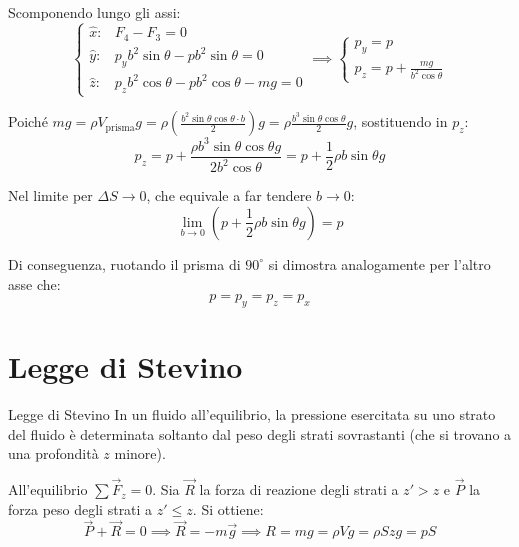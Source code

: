 Scomponendo lungo gli assi:
\begin{equation*}
\begin{cases}
    \hat{x}: & F_4 - F_3 = 0 \\
    \hat{y}: & p_y b^2 \sin\theta - p b^2 \sin\theta = 0 \\
    \hat{z}: & p_z b^2 \cos\theta - p b^2 \cos\theta - mg = 0
\end{cases}
\implies
\begin{cases}
    p_y = p \\
    p_z = p + \frac{mg}{b^2 \cos\theta}
\end{cases}
\end{equation*}

Poiché $mg = \rho V_{\text{prisma}} g = \rho \left( \frac{b^2 \sin\theta \cos\theta \cdot b}{2} \right) g = \rho \frac{b^3 \sin\theta \cos\theta}{2} g$, sostituendo in $p_z$:
\begin{equation}
p_z = p + \frac{\rho b^3 \sin\theta \cos\theta g}{2 b^2 \cos\theta} = p + \frac{1}{2} \rho b \sin\theta g
\end{equation}

Nel limite per $\Delta S \to 0$, che equivale a far tendere $b \to 0$:
\begin{equation}
\lim_{b \to 0} \left( p + \frac{1}{2} \rho b \sin\theta g \right) = p
\end{equation}

Di conseguenza, ruotando il prisma di $90^\circ$ si dimostra analogamente per l'altro asse che:
\begin{equation}
\boxed{p = p_y = p_z = p_x}
\end{equation}

\section{Legge di Stevino}
\begin{teorema}{Legge di Stevino}
In un fluido all'equilibrio, la pressione esercitata su uno strato del fluido è determinata soltanto dal peso degli strati sovrastanti (che si trovano a una profondità $z$ minore).
\end{teorema}

\medskip
All'equilibrio $\sum \vec{F}_z = 0$. Sia $\vec{R}$ la forza di reazione degli strati a $z' > z$ e $\vec{P}$ la forza peso degli strati a $z' \le z$. Si ottiene:
\begin{equation}
\vec{P} + \vec{R} = 0 \implies \vec{R} = -m\vec{g} \implies R = mg = \rho V g = \rho S z g = p S
\end{equation}

